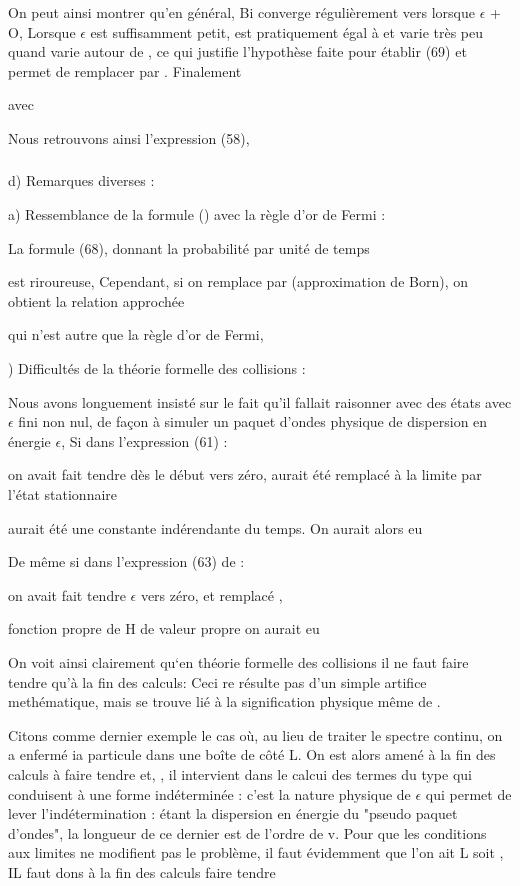 On peut ainsi montrer qu'en général, Bi converge régulièrement vers
 lorsque $\epsilon$ + O, Lorsque $\epsilon$ est suffisamment petit,
 est pratiquement égal à  et varie très peu quand  varie autour
de , ce qui justifie l'hypothèse faite pour établir (69) et permet de
remplacer  par .
Finalement

avec 

Nous retrouvons ainsi l'expression (58),

\subsubsection{}%
d) Remarques diverses :

a) Ressemblance de la formule () avec la règle d'or de Fermi :

La formule (68), donnant la probabilité par unité de temps 

est riroureuse, Cependant, si on remplace  par 
(approximation de Born), on obtient la relation approchée

qui n'est autre que la règle d'or de Fermi,

) Difficultés de la théorie formelle des collisions :

Nous avons longuement insisté sur le fait qu'il fallait raisonner
avec des états  avec $\epsilon$ fini non nul, de façon à simuler un paquet
d'ondes physique de dispersion en énergie $\epsilon$, Si dans l'expression (61) :

on avait fait tendre dès le début  vers zéro, aurait été remplacé à la limite par
l'état stationnaire 

aurait été une constante indérendante du temps. On aurait alors eu 


De même si dans l'expression (63) de  :

on avait fait tendre $\epsilon$ vers zéro, et remplacé ,

fonction propre de H de valeur propre on aurait eu

On voit ainsi clairement qu‘en théorie formelle des collisions
il ne faut faire tendre  qu'à la fin des calculs: Ceci re résulte
pas d'un simple artifice methématique, mais se trouve lié à la signification
physique même de .

Citons comme dernier exemple le cas où, au lieu de traiter le
spectre continu, on a enfermé ia particule dans une boîte de côté L. On
est alors amené à la fin des calculs à faire tendre  et, , il
intervient dans le calcui des termes du type  qui conduisent à une forme
indéterminée : c'est la nature physique de $\epsilon$ qui permet de lever l'indétermination : 
étant la dispersion en énergie du "pseudo paquet d'ondes", la
longueur de ce dernier est de l'ordre de v. Pour que les conditions aux
limites ne modifient pas le problème, il faut évidemment que l'on ait L 
soit , IL faut dons à la fin des calculs faire tendre

